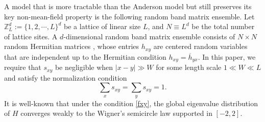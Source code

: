 \documentclass{article}
\newcommand{\1}{\mathds{1}}
\numberwithin{equation}{section}
\newcommand{\be}{\begin{equation}}
\newcommand{\ee}{\end{equation}}
\renewcommand{\geq}{\geqslant}
\renewcommand{\ge}{\geq}
\newcommand{\Z}{\mathbb{Z}}
\theoremstyle{plain} %
\theoremstyle{remark}
\begin{document}
A model that is more tractable than the Anderson model but still preserves its key non-mean-field property is the following random band matrix ensemble. Let $\Z_L^d:=\{1,2, \cdots, L\}^d$ be a lattice of linear size $L$, and $N\equiv L^d$ be the total number of lattice sites. A $d$-dimensional random band matrix ensemble consists of $N\times N$ random Hermitian matrices  \smash{$H=(h_{xy})_{x,y\in \Z_L^d}$}, whose entries  $h_{xy}$ are  centered random variables  that are independent up to the Hermitian condition $h_{xy}=\overline h_{yx}$. 
%
%
In this paper, we require that $s_{xy}$ be negligible when $|x-y|\gg W$ for some length scale $1\ll W \ll L$ and satisfy the normalization condition  %
\be\label{fxy}
\sum_{x}s_{xy}=\sum_{y}s_{xy}=1.
\ee
It is well-known that under the condition \eqref{fxy}, the global eigenvalue distribution of $H$ converges weakly to the Wigner's semicircle law supported in $[-2,2]$. 
\end{document}
